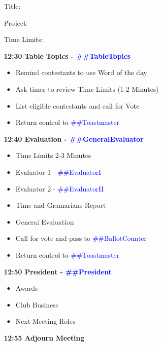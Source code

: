 \documentclass{article}
\newcommand{\toastmaster}{##Toastmaster}
\newcommand{\president}{##President}
\newcommand{\tableTopics}{##TableTopics}
\newcommand{\generalEvaluator}{##GeneralEvaluator}
\newcommand{\evaluatorI}{##EvaluatorI}
\newcommand{\evaluatorII}{##EvaluatorII}
\newcommand{\ballotCounter}{##BallotCounter}
\begin{document}
\begin{spacing}{.8}
\begin{itemize}
      \begin{description}
          \item{Title:}
          \item{Project:}
          \item{Time Limits:}
      \end{description}
  \end{itemize}
  {\Large \bf12:30 Table Topics - \textcolor{blue}{\tableTopics{}}} 
  \begin{itemize}
    \item Remind contestants to use Word of the day
    \item Ask timer to review Time Limits  (1-2 Minutes)
    \item List eligible contestants and call for Vote
    \item Return control to \textcolor{blue}{\toastmaster{}}
  \end{itemize}
  {\Large \bf12:40 Evaluation - \textcolor{blue}{\generalEvaluator{}}} 
  \begin{itemize}
    \item Time Limits 2-3 Minutes
    \item Evaluator 1 - \textcolor{blue}{\evaluatorI{}}
    \item Evaluator 2 - \textcolor{blue}{\evaluatorII{}}
	\item Time and Gramarians Report
	\item General Evaluation
    \item Call for vote and pass to \textcolor{blue}{\ballotCounter{}}
    \item Return control to \textcolor{blue}{\toastmaster{}}
  \end{itemize}
  {\Large \bf12:50 President - \textcolor{blue}{\president{}}} 
  \begin{itemize}
    \item Awards
    \item Club Business
    \item Next Meeting Roles
  \end{itemize}
  {\Large \bf12:55 Adjourn Meeting} 
  \end{spacing}
  
\end{document}
